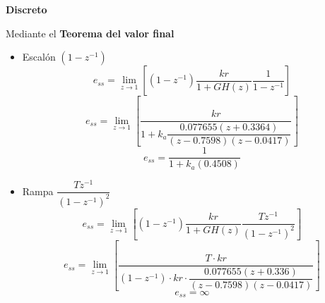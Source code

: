   \begin{center}
   \textbf{Discreto}
  \end{center}
  Mediante el \textbf{Teorema del valor final}
  \begin{itemize}
\item Escalón $(1-z^{-1})$
  \begin{equation}
    e_{ss}=\lim_{z\to 1} \left[(1-z^{-1})\dfrac{kr}{1+GH(z)}\dfrac{1}{1-z^{-1}}\right]
  \end{equation}
    \begin{equation}
          e_{ss}=\lim_{z\to 1} \left[\dfrac{kr}{1+k_a \dfrac{0.077655 (z+0.3364)}{(z-0.7598)(z-0.0417)}}\right]
        \end{equation}
            \begin{equation}
          e_{ss}=\dfrac{1}{1+k_a (0.4508)}
    \end{equation}
  \item Rampa $\dfrac{Tz^{-1}}{(1-z^{-1})^2}$
      \begin{equation}
    e_{ss}=\lim_{z\to 1} \left[(1-z^{-1})\dfrac{kr}{1+GH(z)}\dfrac{Tz^{-1}}{(1-z^{-1})^2}\right]
  \end{equation}
    \begin{equation}
          e_{ss}=\lim_{z\to 1} \left[\dfrac{T\cdot kr}{(1-z^{-1})\cdot
            kr \cdot \dfrac{0.077655(z+0.336)}{(z-0.7598)(z-0.0417)}}\right]
        \end{equation}
            \begin{equation}
          e_{ss}=\infty
    \end{equation}

  \end{itemize}
